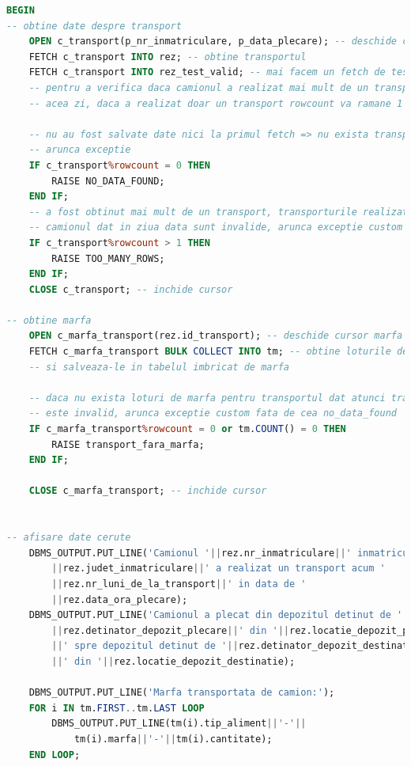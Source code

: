 \documentclass[12pt, a4paper]{article}
\begin{document}
\begin{lstlisting}[language=SQL]
BEGIN
-- obtine date despre transport
    OPEN c_transport(p_nr_inmatriculare, p_data_plecare); -- deschide cursor parametrizat
    FETCH c_transport INTO rez; -- obtine transportul
    FETCH c_transport INTO rez_test_valid; -- mai facem un fetch de test
    -- pentru a verifica daca camionul a realizat mai mult de un transport in
    -- acea zi, daca a realizat doar un transport rowcount va ramane 1
    
    -- nu au fost salvate date nici la primul fetch => nu exista transportul
    -- arunca exceptie
    IF c_transport%rowcount = 0 THEN
        RAISE NO_DATA_FOUND;
    END IF;
    -- a fost obtinut mai mult de un transport, transporturile realizate de
    -- camionul dat in ziua data sunt invalide, arunca exceptie custom
    IF c_transport%rowcount > 1 THEN
        RAISE TOO_MANY_ROWS;
    END IF;
    CLOSE c_transport; -- inchide cursor

-- obtine marfa
    OPEN c_marfa_transport(rez.id_transport); -- deschide cursor marfa
    FETCH c_marfa_transport BULK COLLECT INTO tm; -- obtine loturile de marfa
    -- si salveaza-le in tabelul imbricat de marfa
    
    -- daca nu exista loturi de marfa pentru transportul dat atunci transportul
    -- este invalid, arunca exceptie custom fata de cea no_data_found
    IF c_marfa_transport%rowcount = 0 or tm.COUNT() = 0 THEN
        RAISE transport_fara_marfa;
    END IF;
    
    CLOSE c_marfa_transport; -- inchide cursor

    
-- afisare date cerute
    DBMS_OUTPUT.PUT_LINE('Camionul '||rez.nr_inmatriculare||' inmatriculat in judetul '
        ||rez.judet_inmatriculare||' a realizat un transport acum '
        ||rez.nr_luni_de_la_transport||' in data de '
        ||rez.data_ora_plecare);
    DBMS_OUTPUT.PUT_LINE('Camionul a plecat din depozitul detinut de '
        ||rez.detinator_depozit_plecare||' din '||rez.locatie_depozit_plecare
        ||' spre depozitul detinut de '||rez.detinator_depozit_destinatie
        ||' din '||rez.locatie_depozit_destinatie);
    
    DBMS_OUTPUT.PUT_LINE('Marfa transportata de camion:');
    FOR i IN tm.FIRST..tm.LAST LOOP
        DBMS_OUTPUT.PUT_LINE(tm(i).tip_aliment||'-'||
            tm(i).marfa||'-'||tm(i).cantitate);
    END LOOP;
    

\end{lstlisting}
\end{document}
